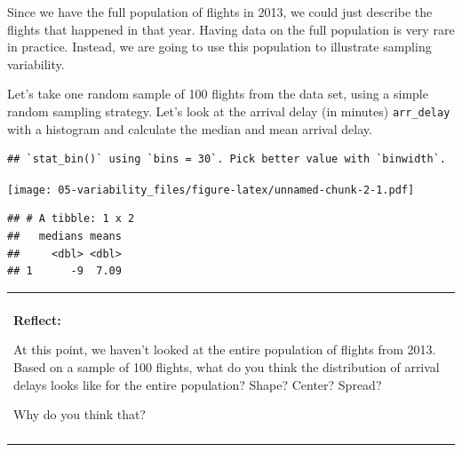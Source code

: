 \documentclass[
]{book}
\newenvironment{Shaded}{\begin{snugshade}}{\end{snugshade}}
\newcommand{\CommentTok}[1]{\textcolor[rgb]{0.56,0.35,0.01}{\textit{#1}}}
\newcommand{\DataTypeTok}[1]{\textcolor[rgb]{0.13,0.29,0.53}{#1}}
\newcommand{\DecValTok}[1]{\textcolor[rgb]{0.00,0.00,0.81}{#1}}
\newcommand{\KeywordTok}[1]{\textcolor[rgb]{0.13,0.29,0.53}{\textbf{#1}}}
\newcommand{\NormalTok}[1]{#1}
\newcommand{\OperatorTok}[1]{\textcolor[rgb]{0.81,0.36,0.00}{\textbf{#1}}}
\newcommand{\StringTok}[1]{\textcolor[rgb]{0.31,0.60,0.02}{#1}}
\newenvironment{reflect}
{
    \begin{center}
    
    \begin{tabular}{|p{0.8\textwidth}|}
    \rowcolor{LightBlue}
    \hline\\
    \rowcolor{LightBlue}
    \textbf{Reflect:}
}
{
    \\\rowcolor{LightBlue}
    \\\hline
    \end{tabular} 
    \end{center}
}
\begin{document}
Since we have the full population of flights in 2013, we could just describe the flights that happened in that year. Having data on the full population is very rare in practice. Instead, we are going to use this population to illustrate sampling variability.

Let's take one random sample of 100 flights from the data set, using a simple random sampling strategy. Let's look at the arrival delay (in minutes) \texttt{arr\_delay} with a histogram and calculate the median and mean arrival delay.

\begin{Shaded}
\end{Shaded}

\begin{verbatim}
## `stat_bin()` using `bins = 30`. Pick better value with `binwidth`.
\end{verbatim}

\texttt{[image: 05-variability\_files/figure-latex/unnamed-chunk-2-1.pdf]}

\begin{Shaded}
\end{Shaded}

\begin{verbatim}
## # A tibble: 1 x 2
##   medians means
##     <dbl> <dbl>
## 1      -9  7.09
\end{verbatim}

\begin{reflect}
At this point, we haven't looked at the entire population of flights
from 2013. Based on a sample of 100 flights, what do you think the
distribution of arrival delays looks like for the entire population?
Shape? Center? Spread?

Why do you think that?
\end{reflect}
\end{document}
